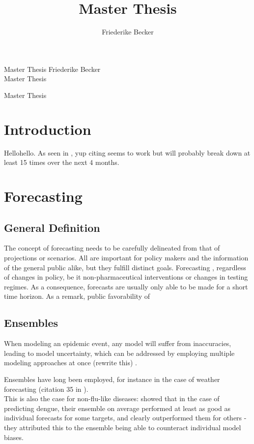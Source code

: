 \documentclass[11pt]{article}
\title{Master Thesis}
\author{Friederike Becker}
\begin{document}
\onehalfspacing

\noindent
Master Thesis  \hfill Friederike Becker \\
Master Thesis\\
\begin{center}

\Large{Master Thesis} 
\end{center}

\normalsize
\vspace{2cm}
\section{Introduction}
Hellohello. As seen in \cite{bracher_pre-registered_2021}, yup citing seems to work but will probably break down at least 15 times over the next 4 months. 
\section{Forecasting}
\subsection{General Definition}
The concept of forecasting needs to be carefully delineated from that of projections or scenarios. All are important for policy makers and the information of the general public alike, but they fulfill distinct goals. Forecasting , regardless of changes in policy, be it non-pharmaceutical interventions or changes in testing regimes. As a consequence, forecasts are usually only able to be made for a short time horizon. As a remark, public favorability of 
\subsection{Ensembles}
When modeling an epidemic event, any model will suffer from inaccuracies, leading to model uncertainty, which can be addressed by employing multiple modeling approaches at once (rewrite this) \cite{zelner_accounting_2021}.

Ensembles have long been employed, for instance in the case of weather forecasting (citation 35 in \cite{yamana_superensemble_2016}).\\
This is also the case for non-flu-like diseases: \cite{yamana_superensemble_2016} showed that in the case of predicting dengue, their ensemble on average performed at least as good as individual forecasts for some targets, and clearly outperformed them for others - they attributed this to the ensemble being able to counteract individual model biases.
\end{document}
